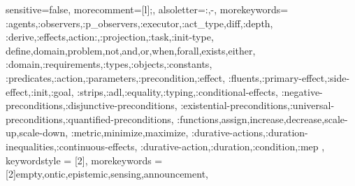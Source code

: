 \usepackage{listings}
{
  sensitive=false,    %
  morecomment=[l]{;}, %
  alsoletter={:,-},   %
  morekeywords={
    :agents,:observers,:p_observers,:executor,:act_type,diff,:depth,
    :derive,:effects,action:,:projection,:task,:init-type,
    define,domain,problem,not,and,or,when,forall,exists,either,
    :domain,:requirements,:types,:objects,:constants,
    :predicates,:action,:parameters,:precondition,:effect,
    :fluents,:primary-effect,:side-effect,:init,:goal,
    :strips,:adl,:equality,:typing,:conditional-effects,
    :negative-preconditions,:disjunctive-preconditions,
    :existential-preconditions,:universal-preconditions,:quantified-preconditions,
    :functions,assign,increase,decrease,scale-up,scale-down,
    :metric,minimize,maximize,
    :durative-actions,:duration-inequalities,:continuous-effects,
    :durative-action,:duration,:condition,:mep
  },
  keywordstyle = [2]{\sffamily\footnotesize},
  morekeywords = [2]{empty,ontic,epistemic,sensing,announcement},
}